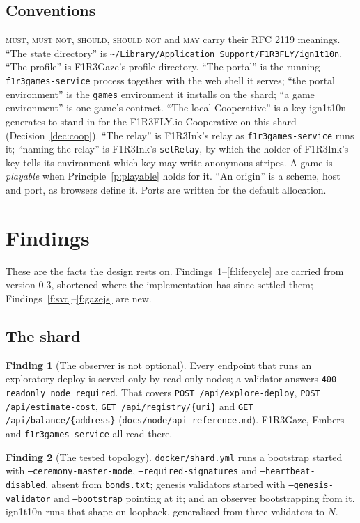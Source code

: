 \documentclass[11pt]{article}
\theoremstyle{definition}
\newtheorem{finding}{Finding}
\theoremstyle{remark}
\newcommand{\MUST}{\textsc{must}}
\newcommand{\MUSTNOT}{\textsc{must not}}
\newcommand{\SHOULD}{\textsc{should}}
\newcommand{\SHOULDNOT}{\textsc{should not}}
\newcommand{\MAY}{\textsc{may}}
\newcommand{\code}[1]{\texttt{#1}}
\newcommand{\Gz}{F1R3Gaze}
\newcommand{\Hr}{ign1t10n}
\newcommand{\Svc}{\code{f1r3games-service}}
\newcommand{\Em}{Embers}
\begin{document}
\subsection{Conventions}

\MUST, \MUSTNOT, \SHOULD, \SHOULDNOT{} and \MAY{} carry their RFC 2119 meanings.
``The state directory'' is \code{\textasciitilde/Library/Application Support/F1R3FLY/ign1t10n}.
``The profile'' is \Gz{}'s profile directory. ``The portal'' is the running \Svc{}
process together with the web shell it serves; ``the portal environment'' is the
\code{games} environment it installs on the shard; ``a game environment'' is one
game's contract. ``The local Cooperative'' is a key \Hr{} generates to stand in for
the F1R3FLY.io Cooperative on this shard (Decision~\ref{dec:coop}). ``The relay''
is F1R3Ink's relay as \Svc{} runs it; ``naming the relay'' is F1R3Ink's
\code{setRelay}, by which the holder of F1R3Ink's key tells its environment which key
may write anonymous stripes. A game is \emph{playable} when Principle~\ref{p:playable}
holds for it. ``An origin'' is a scheme, host and port, as browsers define it. Ports
are written for the default allocation.

\section{Findings}\label{sec:findings}

These are the facts the design rests on. Findings~\ref{f:readonly}--\ref{f:lifecycle}
are carried from version 0.3, shortened where the implementation has since settled
them; Findings~\ref{f:svc}--\ref{f:gazejs} are new.

\subsection{The shard}

\begin{finding}[The observer is not optional]\label{f:readonly}
Every endpoint that runs an exploratory deploy is served only by read-only nodes; a
validator answers \code{400 readonly\_node\_required}. That covers
\code{POST /api/explore-deploy}, \code{POST /api/estimate-cost},
\code{GET /api/registry/\{uri\}} and \code{GET /api/balance/\{address\}}
(\code{docs/node/api-reference.md}). \Gz{}, \Em{} and \Svc{} all read there.
\end{finding}

\begin{finding}[The tested topology]\label{f:topology}
\code{docker/shard.yml} runs a bootstrap started with \code{--ceremony-master-mode},
\code{--required-signatures} and \code{--heartbeat-disabled}, absent from
\code{bonds.txt}; genesis validators started with \code{--genesis-validator} and
\code{--bootstrap} pointing at it; and an observer bootstrapping from it. \Hr{} runs
that shape on loopback, generalised from three validators to $N$.
\end{finding}
\end{document}
